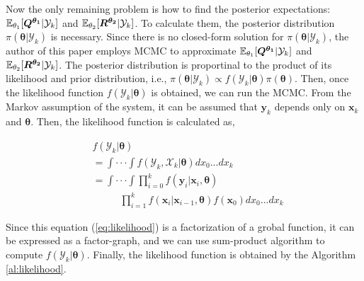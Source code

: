 Now the only remaining problem is how to find the posterior expectations: $\mathbb{E}_{\theta_1}[\bm {Q^{\theta_1}}|\mathcal{Y}_k]$ and $\mathbb{E}_{\theta_2}[\bm{R^{\theta_2}}|\mathcal{Y}_k]$. To calculate them, the posterior distribution $\pi(\bm{\theta}|\mathcal{Y}_k)$ is necessary. Since there is no closed-form solution for $\pi(\bm{\theta}|\mathcal{Y}_k)$, the author of this paper employs MCMC to approximate $\mathbb{E}_{\theta_1}[\bm {Q^{\theta_1}}|\mathcal{Y}_k]$ and $\mathbb{E}_{\theta_2}[\bm{R^{\theta_2}}|\mathcal{Y}_k]$. The posterior distribution is proportinal to the product of its likelihood and prior distribution, i.e., $\pi (\bm{\theta}|\mathcal{Y}_k) \propto f(\mathcal{Y}_k|\bm{\theta})\pi(\bm{\theta})$. Then, once the likelihood function $f(\mathcal{Y}_k|\bm{\theta})$ is obtained, we can run the MCMC. From the Markov assumption of the system, it can be assumed that $\bm{y}_k$ depends only on $\bm{x}_k$ and $\bm{\theta}$. Then, the likelihood function is calculated as,

\begin{align} \label{eq:likelihood}
&f(\mathcal{Y}_k|\bm{\theta}) \nonumber\\
& = \int\cdot\cdot\cdot\int f(\mathcal{Y}_k, \mathcal{X}_k|\bm{\theta})dx_0...dx_k \nonumber\\
& = \int\cdot\cdot\cdot\int \prod^{k}_{i=0}f(\bm{y}_i| \bm{x}_i,\bm{\theta})\nonumber\\
&\;\;\;\;\;\;\;\;\;\;\prod^{k}_{i=1}f(\bm{x}_i|\bm{x}_{i-1}, \bm{\theta})f(\bm{x}_0)dx_0...dx_k
\end{align}

Since this equation (\ref{eq:likelihood}) is a factorization of a grobal function, it can be expressed as a factor-graph, and we can use sum-product algorithm\cite{Kschischang2001} to compute $f(\mathcal{Y}_k|\bm{\theta})$. Finally, the likelihood function is obtained by the Algorithm \ref{al:likelihood}.

